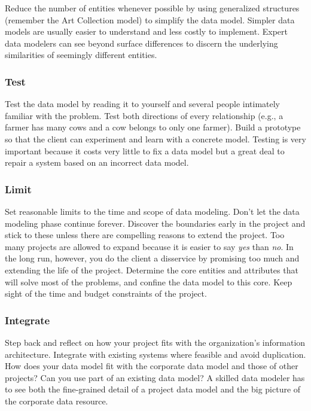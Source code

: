\documentclass[
]{article}
\begin{document}
Reduce the number of entities whenever possible by using generalized
structures (remember the Art Collection model) to simplify the data
model. Simpler data models are usually easier to understand and less
costly to implement. Expert data modelers can see beyond surface
differences to discern the underlying similarities of seemingly
different entities.

\hypertarget{test}{%
\subsubsection*{Test}\label{test}}

Test the data model by reading it to yourself and several people
intimately familiar with the problem. Test both directions of every
relationship (e.g., a farmer has many cows and a cow belongs to only one
farmer). Build a prototype so that the client can experiment and learn
with a concrete model. Testing is very important because it costs very
little to fix a data model but a great deal to repair a system based on
an incorrect data model.

\hypertarget{limit}{%
\subsubsection*{Limit}\label{limit}}

Set reasonable limits to the time and scope of data modeling. Don't let
the data modeling phase continue forever. Discover the boundaries early
in the project and stick to these unless there are compelling reasons to
extend the project. Too many projects are allowed to expand because it
is easier to say \emph{yes} than \emph{no}. In the long run, however, you do the
client a disservice by promising too much and extending the life of the
project. Determine the core entities and attributes that will solve most
of the problems, and confine the data model to this core. Keep sight of
the time and budget constraints of the project.

\hypertarget{integrate}{%
\subsubsection*{Integrate}\label{integrate}}

Step back and reflect on how your project fits with the organization's
information architecture. Integrate with existing systems where feasible
and avoid duplication. How does your data model fit with the corporate
data model and those of other projects? Can you use part of an existing
data model? A skilled data modeler has to see both the fine-grained
detail of a project data model and the big picture of the corporate data
resource.
\end{document}
